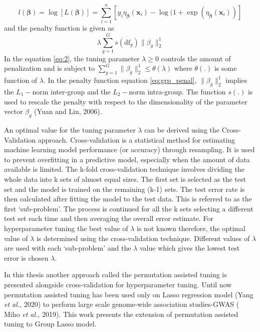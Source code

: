 \begin{equation}\label{eq:3}
l(\pmb{\beta})=\log[L(\pmb{\beta})]=\sum_{i=1}^{n}[y_i\eta_{\pmb{\beta}}(\mathbf{x}_i)-\log(1+\exp(\eta_{\pmb{\beta}}(\mathbf{x}_i))]
\end{equation}
and the penalty function is given as
\begin{equation}\label{eq:grp_penal}
\lambda\sum_{g=1}^{G} s(\text{df}_g)\|\beta_g\|_2^1
\end{equation}
In the equation \eqref{eq:2}, the tuning parameter $\lambda\ge 0$ controls the amount of penalization and is subject to $\sum_{g=1}^{G}\|\beta_g\|_2^1\le \theta(\lambda)$ where $\theta(.)$ is some function of $\lambda$. In the penalty function equation \eqref{eq:grp_penal}, $\|\beta_g\|_2^1$ implies the $L_1-$norm inter-group and the $L_2-$norm intra-group. The function $s(.)$ is used to rescale the penalty with respect to the dimensionality of the parameter vector $\beta_g$ (\cite{grouporigin}Yuan and Lin, 2006).\par
An optimal value for the tuning parameter $\lambda$ can be derived using the Cross-Validation approach. Cross-validation is a statistical method for estimating machine learning model performance (or accuracy) through resampling. It is used to prevent overfitting in a predictive model, especially when the amount of data available is limited. The k-fold cross-validation technique involves dividing the whole data into k sets of almost equal sizes. The first set is selected as the test set and the model is trained on the remaining (k-1) sets. The test error rate is then calculated after fitting the model to the test data. This is referred to as the first \lq sub-problem'. The process is continued for all the k sets selecting a different test set each time and then averaging the overall error estimate. For hyperparameter tuning the best value of $\lambda$ is not known therefore, the optimal value of $\lambda$ is determined using the cross-validation technique. Different values of $\lambda$ are used with each \lq sub-problem’ and the $\lambda$ value which gives the lowest test error is chosen $\lambda$.\par
In this thesis another approach called the permutation assisted tuning is presented alongside cross-validation for hyperparameter tuning. Until now permutation assisted tuning has been used only on Lasso regression model (\cite{permassisttune}Yang \textit{et al.}, 2020) to perform large scale genome-wide association studies-GWAS (\cite{tcr_ntw} Miho \textit{et al.}, 2019). This work presents the extension of permutation assisted tuning to Group Lasso model.\\[6pt]
